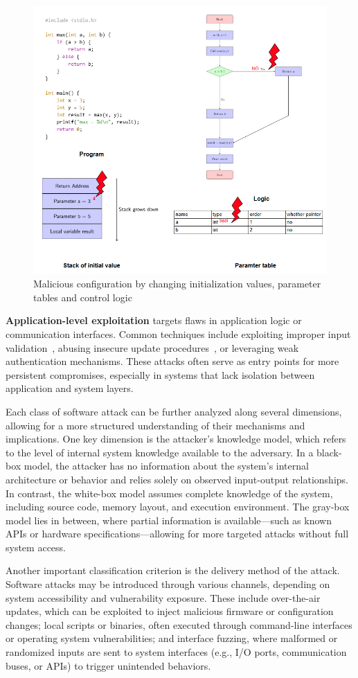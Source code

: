 \begin{figure}[t!]
  \centering
  \includegraphics[width=0.5\linewidth]{Chapitre1/figures/malicious.png}
  \caption{Malicious configuration by changing initialization values, parameter tables and control logic}
  \label{malicious}
\end{figure}

\textbf{Application-level exploitation} targets flaws in application logic or communication interfaces. Common techniques include exploiting improper input validation~\cite{hayati2008modeling}, abusing insecure update procedures~\cite{alhamed2013stacking}, or leveraging weak authentication mechanisms. These attacks often serve as entry points for more persistent compromises, especially in systems that lack isolation between application and system layers.

Each class of software attack can be further analyzed along several dimensions, allowing for a more structured understanding of their mechanisms and implications. One key dimension is the attacker’s knowledge model, which refers to the level of internal system knowledge available to the adversary. In a black-box model, the attacker has no information about the system’s internal architecture or behavior and relies solely on observed input-output relationships. In contrast, the white-box model assumes complete knowledge of the system, including source code, memory layout, and execution environment. The gray-box model lies in between, where partial information is available—such as known APIs or hardware specifications—allowing for more targeted attacks without full system access.

Another important classification criterion is the delivery method of the attack. Software attacks may be introduced through various channels, depending on system accessibility and vulnerability exposure. These include over-the-air updates, which can be exploited to inject malicious firmware or configuration changes; local scripts or binaries, often executed through command-line interfaces or operating system vulnerabilities; and interface fuzzing, where malformed or randomized inputs are sent to system interfaces (e.g., I/O ports, communication buses, or APIs) to trigger unintended behaviors.

